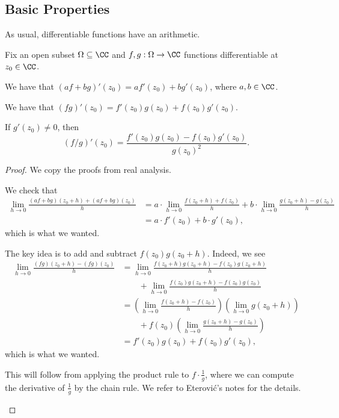 \subsection{Basic Properties}
As usual, differentiable functions have an arithmetic.
\begin{proposition}
	Fix an open subset $\Omega\subseteq\CC$ and $f,g:\Omega\to\CC$ functions differentiable at $z_0\in\CC$.
	\begin{listalph}
		\item We have that $(af+bg)'(z_0)=af'(z_0)+bg'(z_0)$, where $a,b\in\CC$.
		\item We have that $(fg)'(z_0)=f'(z_0)g(z_0)+f(z_0)g'(z_0)$.
		\item If $g'(z_0)\ne0$, then
		\[(f/g)'(z_0)=\frac{f'(z_0)g(z_0)-f(z_0)g'(z_0)}{g(z_0)^2}.\]
	\end{listalph}
\end{proposition}
\begin{proof}
	We copy the proofs from real analysis.
	\begin{listalph}
		\item We check that
		\begin{align*}
			\lim_{h\to0}\frac{(af+bg)(z_0+h)+(af+bg)(z_0)}h &= a\cdot\lim_{h\to0}\frac{f(z_0+h)+f(z_0)}h+b\cdot\lim_{h\to0}\frac{g(z_0+h)-g(z_0)}h \\
			&= a\cdot f'(z_0)+b\cdot g'(z_0),
		\end{align*}
		which is what we wanted.
		\item The key idea is to add and subtract $f(z_0)g(z_0+h)$. Indeed, we see
		\begin{align*}
			\lim_{h\to0}\frac{(fg)(z_0+h)-(fg)(z_0)}{h} &= \lim_{h\to0}\frac{f(z_0+h)g(z_0+h)-f(z_0)g(z_0+h)}{h} \\
			&\qquad+\lim_{h\to0}\frac{f(z_0)g(z_0+h)-f(z_0)g(z_0)}h \\
			&= \left(\lim_{h\to0}\frac{f(z_0+h)-f(z_0)}{h}\right)\left(\lim_{h\to0}g(z_0+h)\right) \\
			&\qquad+f(z_0)\left(\lim_{h\to0}\frac{g(z_0+h)-g(z_0)}h\right) \\
			&= f'(z_0)g(z_0)+f(z_0)g'(z_0),
		\end{align*}
		which is what we wanted.
		\item This will follow from applying the product rule to $f\cdot\frac1g$, where we can compute the derivative of $\frac1g$ by the chain rule. We refer to Eterovi\'c's notes for the details.
		\qedhere
	\end{listalph}
\end{proof}
